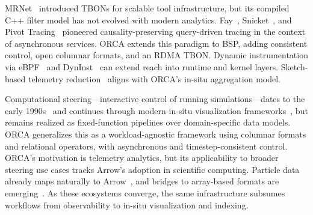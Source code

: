 MRNet~\cite{Roth2003:MRNet} introduced TBONs for scalable tool infrastructure, but its compiled C++
filter model has not evolved with modern analytics.
Fay~\cite{Erlin2011:Fay}, Snicket~\cite{Berg2021:Snicket}, and Pivot Tracing~\cite{Mace2015:Pivottracing} pioneered 
causality-preserving query-driven tracing in the context of asynchronous services.
ORCA extends this paradigm to BSP, adding consistent control, open columnar formats, and
an RDMA TBON.
Dynamic instrumentation via eBPF~\cite{:eBPF} and DynInst~\cite{Berna2011:DynInst} can extend reach
into runtime and kernel layers.
Sketch-based telemetry reduction~\cite{Sriva2024:Circa} aligns with ORCA's in-situ aggregation
model.


Computational steering---interactive control of running simulations---dates to the early
1990s~\cite{Mille1998:SCIRun,Geist1997:Cumulvs} and continues through modern in-situ visualization
frameworks~\cite{Ayach2015:Catalyst,Larse2022:Ascent}, but remains realized as fixed-function
pipelines over domain-specific data models.
ORCA generalizes this as a workload-agnostic framework using columnar formats and relational
operators, with asynchronous and timestep-consistent control.
ORCA's motivation is telemetry analytics, but its applicability to broader steering use cases
tracks Arrow's adoption in scientific computing.
Particle data already maps naturally to
Arrow~\cite{Liu2022:ProcessingParticleData,Ulmer2023:ExtendingComposableDatab}, and bridges to
array-based formats are emerging~\cite{2026:arrow-zarr,:DLPackProtocolApache}.
As these ecosystems converge, the same infrastructure subsumes workflows from observability to
in-situ visualization and indexing.

